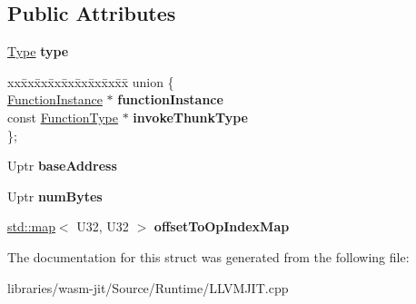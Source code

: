 \subsection*{Public Attributes}
\begin{DoxyCompactItemize}
\item 
\mbox{\label{struct_l_l_v_m_j_i_t_1_1_j_i_t_symbol_a6227b38fce8940d4ce2f505e3a89e312}} 
\mbox{\hyperlink{struct_type}{Type}} {\bfseries type}
\item 
\mbox{\label{struct_l_l_v_m_j_i_t_1_1_j_i_t_symbol_a20a793353d48dee84ce81d3016c08093}} 
\begin{tabbing}
xx\=xx\=xx\=xx\=xx\=xx\=xx\=xx\=xx\=\kill
union \{\\
\>\mbox{\hyperlink{struct_runtime_1_1_function_instance}{FunctionInstance}} $\ast$ {\bfseries functionInstance}\\
\>const \mbox{\hyperlink{struct_i_r_1_1_function_type}{FunctionType}} $\ast$ {\bfseries invokeThunkType}\\
\}; \\

\end{tabbing}\item 
\mbox{\label{struct_l_l_v_m_j_i_t_1_1_j_i_t_symbol_aa5442f46581cb5055d494d180348842f}} 
Uptr {\bfseries base\+Address}
\item 
\mbox{\label{struct_l_l_v_m_j_i_t_1_1_j_i_t_symbol_a40650a95b3fa348003efddcb896b849b}} 
Uptr {\bfseries num\+Bytes}
\item 
\mbox{\label{struct_l_l_v_m_j_i_t_1_1_j_i_t_symbol_a14f2803927d8b7b285939387ed4da96e}} 
\mbox{\hyperlink{classstd_1_1map}{std\+::map}}$<$ U32, U32 $>$ {\bfseries offset\+To\+Op\+Index\+Map}
\end{DoxyCompactItemize}


The documentation for this struct was generated from the following file\+:\begin{DoxyCompactItemize}
\item 
libraries/wasm-\/jit/\+Source/\+Runtime/L\+L\+V\+M\+J\+I\+T.\+cpp\end{DoxyCompactItemize}
